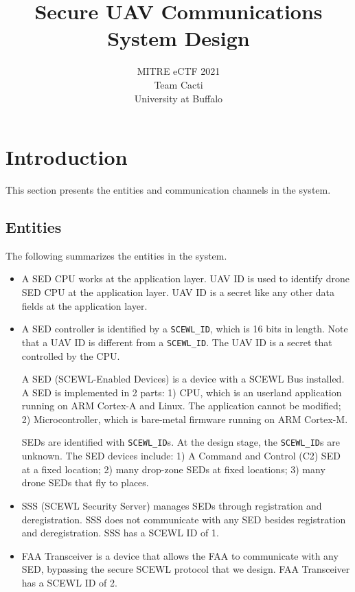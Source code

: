 \documentclass[11pt,oneside,onecolumn,letterpaper]{article}
\title{Secure UAV Communications System Design}
\author{MITRE eCTF 2021\\Team Cacti\\ University at Buffalo}
\date{}
\begin{document}
\normalsize


\maketitle

\renewcommand{\thepage}{System Design, Team Cacti, University at Buffalo--\arabic{page}}
\setcounter{page}{1} \normalsize
%

\newcommand{\flagRollback}{\textsf{Rollback}\xspace}

\section{Introduction}

This section presents the entities and communication channels in the system.

\subsection{Entities}

The following summarizes the entities in the system.

\begin{itemize}
	\item A SED CPU works at the application layer. UAV ID is used to identify drone SED CPU at the application layer. UAV ID is a secret like any other data fields at the application layer.
	
	\item A SED controller is identified by a \verb|SCEWL_ID|, which is 16 bits in length. Note that a UAV ID is different from a \verb|SCEWL_ID|. The UAV ID is a secret that controlled by the CPU.

A SED (SCEWL-Enabled Devices) is a device with a SCEWL Bus installed. 
A SED is implemented in 2 parts: 1) CPU, which is an userland application running on  ARM Cortex-A and Linux. The application cannot be modified; 2) 
Microcontroller, which is bare-metal firmware running on ARM Cortex-M. 
	
SEDs are identified with \verb|SCEWL_ID|s. At the design stage, the \verb|SCEWL_ID|s are unknown. The SED devices include: 
1) A Command and Control (C2) SED at a fixed location; 
2) many drop-zone SEDs at fixed locations; 
3) many drone SEDs that fly to places.
	
	\item SSS (SCEWL Security Server) manages SEDs through registration
and deregistration. SSS does not communicate with any SED besides registration
and deregistration. SSS has a SCEWL ID of 1.
	
	\item FAA Transceiver is a device that allows the FAA to communicate with any SED, bypassing the secure SCEWL protocol that we design. FAA Transceiver has a SCEWL ID of 2.
\end{itemize}
\end{document}
